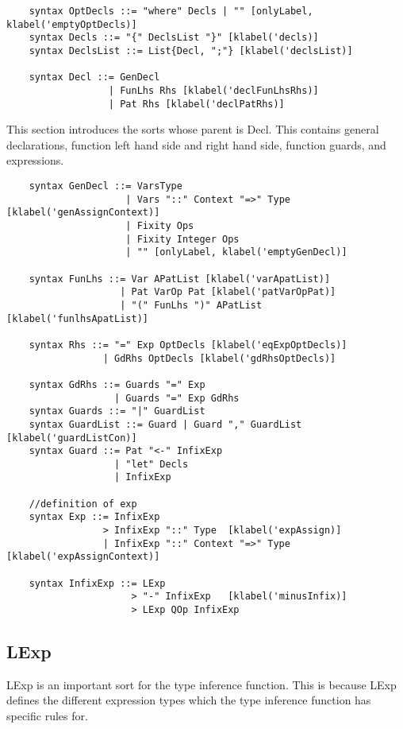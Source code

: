 \begin{lstlisting}
    syntax OptDecls ::= "where" Decls | "" [onlyLabel, klabel('emptyOptDecls)]
    syntax Decls ::= "{" DeclsList "}" [klabel('decls)]
    syntax DeclsList ::= List{Decl, ";"} [klabel('declsList)]

    syntax Decl ::= GenDecl
                  | FunLhs Rhs [klabel('declFunLhsRhs)]
                  | Pat Rhs [klabel('declPatRhs)]
\end{lstlisting}

This section introduces the sorts whose parent is Decl. This contains general declarations, function left hand side and right hand side, function guards, and expressions.

\begin{lstlisting}
    syntax GenDecl ::= VarsType
                     | Vars "::" Context "=>" Type   [klabel('genAssignContext)]
                     | Fixity Ops
                     | Fixity Integer Ops
                     | "" [onlyLabel, klabel('emptyGenDecl)]

    syntax FunLhs ::= Var APatList [klabel('varApatList)]
                    | Pat VarOp Pat [klabel('patVarOpPat)]
                    | "(" FunLhs ")" APatList [klabel('funlhsApatList)]

    syntax Rhs ::= "=" Exp OptDecls [klabel('eqExpOptDecls)]
                 | GdRhs OptDecls [klabel('gdRhsOptDecls)]

    syntax GdRhs ::= Guards "=" Exp
                   | Guards "=" Exp GdRhs
    syntax Guards ::= "|" GuardList
    syntax GuardList ::= Guard | Guard "," GuardList  [klabel('guardListCon)]
    syntax Guard ::= Pat "<-" InfixExp
                   | "let" Decls
                   | InfixExp

    //definition of exp
    syntax Exp ::= InfixExp
                 > InfixExp "::" Type  [klabel('expAssign)]
                 | InfixExp "::" Context "=>" Type  [klabel('expAssignContext)]

    syntax InfixExp ::= LExp
                      > "-" InfixExp   [klabel('minusInfix)]
                      > LExp QOp InfixExp
\end{lstlisting}

\subsection{LExp}
LExp is an important sort for the type inference function. This is because LExp defines the different expression types which the type inference function has specific rules for.

